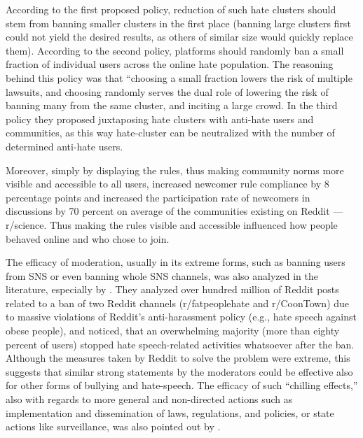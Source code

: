 \documentclass[a4paper,fleqn]{cas-dc}
\begin{document}
According to the first proposed policy, reduction of such hate clusters
should stem from banning smaller clusters in the first place (banning
large clusters first could not yield the desired results, as others of
similar size would quickly replace them). According to the second
policy, platforms should randomly ban a small fraction of individual
users across the online hate population. The reasoning behind this
policy was that ``choosing a small fraction lowers the risk of multiple
lawsuits, and choosing randomly serves the dual role of lowering the
risk of banning many from the same cluster, and inciting a large crowd.
In the third policy they proposed juxtaposing hate clusters with
anti-hate users and communities, as this way hate-cluster can be
neutralized with the number of determined anti-hate users.

Moreover, simply by displaying the rules, thus making community norms
more visible and accessible to all users, \citet{matias2019preventing} increased
newcomer rule compliance by 8 percentage points and increased the
participation rate of newcomers in discussions by 70 percent on average
of the communities existing on Reddit --- r/science. Thus making the
rules visible and accessible influenced how people behaved online and
who chose to join.

The efficacy of moderation, usually in its extreme forms, such as
banning users from SNS or even banning whole SNS channels, was also
analyzed in the literature, especially by \citet{chandrasekharan2017you}. 
They analyzed over hundred million of Reddit posts related to a ban of
two Reddit channels (r/fatpeoplehate and r/CoonTown) due to massive
violations of Reddit's anti-harassment policy (e.g., hate speech against
obese people), and noticed, that an overwhelming majority (more than
eighty percent of users) stopped hate speech-related activities
whatsoever after the ban. Although the measures taken by Reddit to solve
the problem were extreme, this suggests that similar strong statements
by the moderators could be effective also for other forms of bullying
and hate-speech. The efficacy of such ``chilling effects,'' also with
regards to more general and non-directed actions such as implementation
and dissemination of laws, regulations, and policies, or state actions
like surveillance, was also pointed out by \citet{penney2017internet}.
\end{document}
